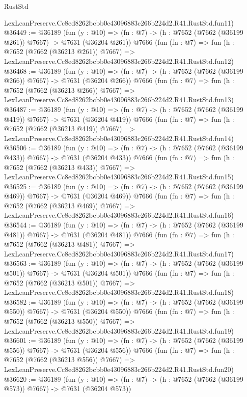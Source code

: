 \begin{lexlean}{RustStd}
\begin{coremodule}
    LexLeanPreserve.Cc8ed8262bcbb0e43096883c266b224d2.R41.RustStd.fun11)
@36449 := @36189
    (fun (y : @10) => (fn : @7) -> (h : @7652 (@7662 (@36199 @261)) @7667) -> @7631 (@36204 @261))
    @7666
    (fun (fn : @7) =>
    fun (h : @7652 (@7662 (@36213 @261)) @7667) =>
    LexLeanPreserve.Cc8ed8262bcbb0e43096883c266b224d2.R41.RustStd.fun12)
@36468 := @36189
    (fun (y : @10) => (fn : @7) -> (h : @7652 (@7662 (@36199 @266)) @7667) -> @7631 (@36204 @266))
    @7666
    (fun (fn : @7) =>
    fun (h : @7652 (@7662 (@36213 @266)) @7667) =>
    LexLeanPreserve.Cc8ed8262bcbb0e43096883c266b224d2.R41.RustStd.fun13)
@36487 := @36189
    (fun (y : @10) => (fn : @7) -> (h : @7652 (@7662 (@36199 @419)) @7667) -> @7631 (@36204 @419))
    @7666
    (fun (fn : @7) =>
    fun (h : @7652 (@7662 (@36213 @419)) @7667) =>
    LexLeanPreserve.Cc8ed8262bcbb0e43096883c266b224d2.R41.RustStd.fun14)
@36506 := @36189
    (fun (y : @10) => (fn : @7) -> (h : @7652 (@7662 (@36199 @433)) @7667) -> @7631 (@36204 @433))
    @7666
    (fun (fn : @7) =>
    fun (h : @7652 (@7662 (@36213 @433)) @7667) =>
    LexLeanPreserve.Cc8ed8262bcbb0e43096883c266b224d2.R41.RustStd.fun15)
@36525 := @36189
    (fun (y : @10) => (fn : @7) -> (h : @7652 (@7662 (@36199 @469)) @7667) -> @7631 (@36204 @469))
    @7666
    (fun (fn : @7) =>
    fun (h : @7652 (@7662 (@36213 @469)) @7667) =>
    LexLeanPreserve.Cc8ed8262bcbb0e43096883c266b224d2.R41.RustStd.fun16)
@36544 := @36189
    (fun (y : @10) => (fn : @7) -> (h : @7652 (@7662 (@36199 @481)) @7667) -> @7631 (@36204 @481))
    @7666
    (fun (fn : @7) =>
    fun (h : @7652 (@7662 (@36213 @481)) @7667) =>
    LexLeanPreserve.Cc8ed8262bcbb0e43096883c266b224d2.R41.RustStd.fun17)
@36563 := @36189
    (fun (y : @10) => (fn : @7) -> (h : @7652 (@7662 (@36199 @501)) @7667) -> @7631 (@36204 @501))
    @7666
    (fun (fn : @7) =>
    fun (h : @7652 (@7662 (@36213 @501)) @7667) =>
    LexLeanPreserve.Cc8ed8262bcbb0e43096883c266b224d2.R41.RustStd.fun18)
@36582 := @36189
    (fun (y : @10) => (fn : @7) -> (h : @7652 (@7662 (@36199 @550)) @7667) -> @7631 (@36204 @550))
    @7666
    (fun (fn : @7) =>
    fun (h : @7652 (@7662 (@36213 @550)) @7667) =>
    LexLeanPreserve.Cc8ed8262bcbb0e43096883c266b224d2.R41.RustStd.fun19)
@36601 := @36189
    (fun (y : @10) => (fn : @7) -> (h : @7652 (@7662 (@36199 @556)) @7667) -> @7631 (@36204 @556))
    @7666
    (fun (fn : @7) =>
    fun (h : @7652 (@7662 (@36213 @556)) @7667) =>
    LexLeanPreserve.Cc8ed8262bcbb0e43096883c266b224d2.R41.RustStd.fun20)
@36620 := @36189
    (fun (y : @10) => (fn : @7) -> (h : @7652 (@7662 (@36199 @573)) @7667) -> @7631 (@36204 @573))

\end{coremodule}
\end{lexlean}
